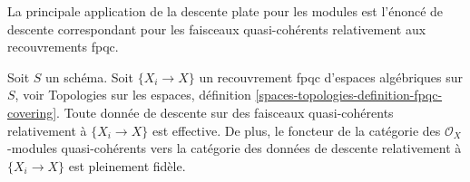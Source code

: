 \noindent
La principale application de la descente plate pour les modules est
l'énoncé de descente correspondant pour les faisceaux quasi-cohérents
relativement aux recouvrements fpqc.

\begin{proposition}
\label{proposition-fpqc-descent-quasi-coherent}
Soit $S$ un schéma.
Soit $\{X_i \to X\}$ un recouvrement fpqc d'espaces algébriques sur $S$, voir
Topologies sur les espaces,
définition \ref{spaces-topologies-definition-fpqc-covering}.
Toute donnée de descente sur des faisceaux quasi-cohérents
relativement à $\{X_i \to X\}$ est effective.
De plus, le foncteur de la catégorie des
$\mathcal{O}_X$-modules quasi-cohérents vers la catégorie
des données de descente relativement à $\{X_i \to X\}$ est pleinement fidèle.
\end{proposition}


